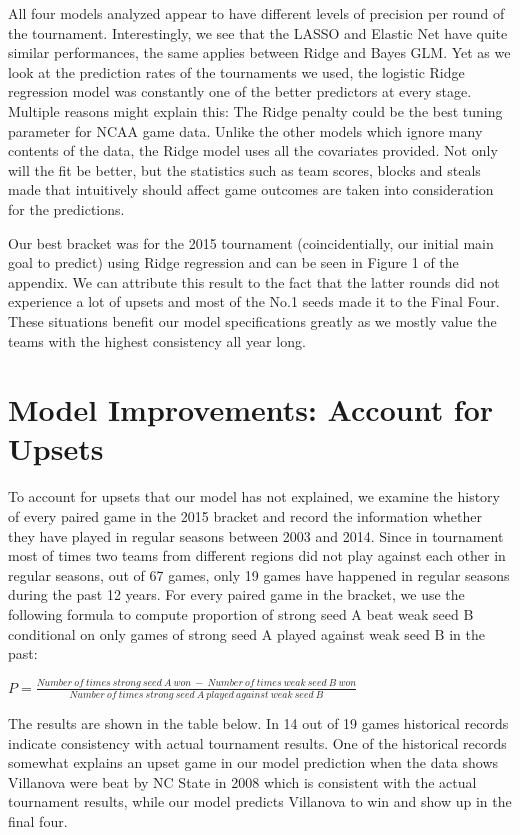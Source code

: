 \documentclass{article} %
\begin{document}
All four models analyzed appear to have different levels of precision per round of the tournament. Interestingly, we see that the LASSO and Elastic Net have quite similar performances, the same applies between Ridge and Bayes GLM. Yet as we look at the prediction rates of the tournaments we used, the logistic Ridge regression model was constantly one of the better predictors at every stage. Multiple reasons might explain this: The Ridge penalty could be the best tuning parameter for NCAA game data. Unlike the other models which ignore many contents of the data, the Ridge model uses all the covariates provided. Not only will the fit be better, but the statistics such as team scores, blocks and steals made that intuitively should affect game outcomes are taken into consideration for the predictions.

Our best bracket was for the 2015 tournament (coincidentially, our initial main goal to predict) using Ridge regression and can be seen in Figure 1 of the appendix. We can attribute this result to the fact that the latter rounds did not experience a lot of upsets and most of the No.1 seeds made it to the Final Four. These situations benefit our model specifications greatly as we mostly value the teams with the highest consistency all year long.\

\section{Model Improvements: Account for Upsets}

To account for upsets that our model has not explained, we examine the history of every paired game in the 2015 bracket and record the information whether they have played in regular seasons between 2003 and 2014. Since in tournament most of times two teams from different regions did not play against each other in regular seasons, out of 67 games, only 19 games have happened in regular seasons during the past 12 years. For every paired game in the bracket, we use the following formula to compute proportion of strong seed A beat weak seed B conditional on only games of strong seed A played against weak seed B in the past:

$P=\frac{Number \ of \ times \ strong \ seed \ A \ won \ - \ Number \ of \ times \ weak \ seed \ B \ won}{Number \ of \ times \ strong \ seed \ A \ played \ against \ weak \ seed \ B }$


The results are shown in the table below. In 14 out of 19 games historical records indicate consistency with actual tournament results. One of the historical records somewhat explains an upset game in our model prediction when the data shows Villanova were beat by NC State in 2008 which is consistent with the actual tournament results, while our model predicts Villanova to win and show up in the final four. 
\end{document}
